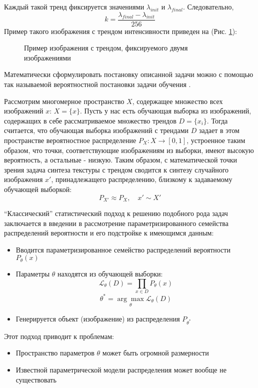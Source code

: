 	Каждый такой тренд фиксируется значениями $\lambda_{init}$ и $\lambda_{final}$. Следовательно, 
	$$k = \frac{\lambda_{final} - \lambda_{init}}{256}$$
	Пример такого изображения с трендом интенсивности приведен на (Рис. \ref{1-trend-example}):
	
	\begin{figure}[h]
		\caption{Пример изображения с трендом, фиксируемого двумя изображениями}
		\label{1-trend-example}
	\end{figure}
	
	Математически сформулировать постановку описанной задачи можно с помощью так называемой вероятностной постановки задачи обучения \cite{Voron-ML, GAN-original}.
	
	Рассмотрим многомерное пространство $X$, содержащее множество всех изображений $x$: $X = \{x\}$. Пусть у нас есть обучающая выборка из изображений, содержащих в себе рассматриваемое множество трендов $D = \{x_i\}$. Тогда считается, что  обучающая выборка изображений с трендами $D$ задает в этом пространстве вероятностное распределение $P_X : X \longrightarrow [0,1]$, устроенное таким образом, что точки, соответствующие изображениям из выборки, имеют высокую вероятность, а остальные - низкую. Таким образом, с математической точки зрения задача синтеза текстуры с трендом сводится к синтезу случайного изображения $x'$, принадлежащего распределению, близкому к задаваемому обучающей выборкой:
	$$ P_{X'} \approx P_X, \quad x' \sim X'$$
	
	``Классический'' статистический подход к решению подобного рода задач заключается в введении в рассмотрение параметризированного семейства распределений вероятности и его подстройке к имеющимся данным:
	
	\begin{itemize}
		\item Вводится параметризированное семейство распределений вероятности $P_{\theta}(x)$
		\item Параметры $\theta$ находятся из обучающей выборки:
		$$ \mathcal{L}_{\theta}(D) = \prod_{x \in D} P_{\theta}(x) $$
		$$ \theta^{*} = \underset{\theta}{\arg\max} \mathcal{L}_{\theta}(D)$$
		\item Генерируется объект (изображение) из распределения $ P_{\theta^{*}}$
	\end{itemize}
	
	Этот подход приводит к проблемам:
	
	\begin{itemize}
		\item Пространство параметров $\theta$ может быть огромной размерности
		\item Известной параметрической модели распределения может вообще не существовать
	\end{itemize}
	

